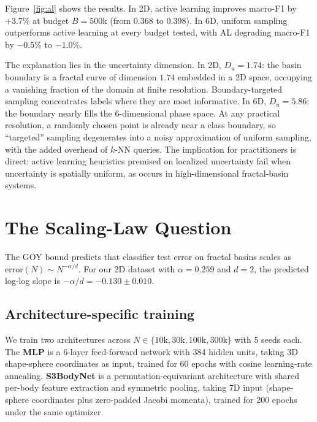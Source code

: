 \documentclass[10pt]{article}
\begin{document}
Figure~\ref{fig:al} shows the results. In 2D, active learning improves macro-F1 by $+3.7\%$ at budget $B = 500$k (from $0.368$ to $0.398$). In 6D, uniform sampling outperforms active learning at every budget tested, with AL degrading macro-F1 by $-0.5\%$ to $-1.0\%$.

The explanation lies in the uncertainty dimension. In 2D, $D_u = 1.74$: the basin boundary is a fractal curve of dimension $1.74$ embedded in a 2D space, occupying a vanishing fraction of the domain at finite resolution. Boundary-targeted sampling concentrates labels where they are most informative. In 6D, $D_u = 5.86$: the boundary nearly fills the 6-dimensional phase space. At any practical resolution, a randomly chosen point is already near a class boundary, so ``targeted'' sampling degenerates into a noisy approximation of uniform sampling, with the added overhead of $k$-NN queries. The implication for practitioners is direct: active learning heuristics premised on localized uncertainty fail when uncertainty is spatially uniform, as occurs in high-dimensional fractal-basin systems.

\section{The Scaling-Law Question}

The GOY bound \citep{GOY1983} predicts that classifier test error on fractal basins scales as $\text{error}(N) \sim N^{-\alpha/d}$. For our 2D dataset with $\alpha = 0.259$ and $d = 2$, the predicted log-log slope is $-\alpha/d = -0.130 \pm 0.010$.

\subsection{Architecture-specific training}

We train two architectures across $N \in \{10\text{k}, 30\text{k}, 100\text{k}, 300\text{k}\}$ with 5 seeds each. The \textbf{MLP} is a 6-layer feed-forward network with 384 hidden units, taking 3D shape-sphere coordinates as input, trained for 60 epochs with cosine learning-rate annealing. \textbf{S3BodyNet} is a permutation-equivariant architecture \citep{DeepSets2017} with shared per-body feature extraction and symmetric pooling, taking 7D input (shape-sphere coordinates plus zero-padded Jacobi momenta), trained for 200 epochs under the same optimizer.
\end{document}
